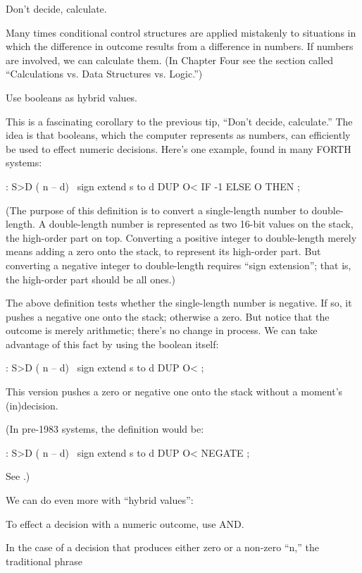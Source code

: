 \begin{tip}
Don't decide, calculate.
\end{tip}
Many times conditional control structures are applied mistakenly to
situations in which the difference in outcome results from a difference in
numbers. If numbers are involved, we can calculate them. (In Chapter
Four see the section called ``Calculations vs. Data Structures vs. Logic.'')

\begin{tip}
Use booleans as hybrid values.
\end{tip}
This is a fascinating corollary to the previous tip, ``Don't decide,
calculate.'' The idea is that booleans, which the computer represents as
numbers, can efficiently be used to effect numeric decisions. Here's one
example, found in many FORTH systems:

\begin{Code}
: S>D  ( n -- d)  \ sign extend s to d
     DUP O<  IF -1  ELSE  O THEN ;
\end{Code}
(The purpose of this definition is to convert a single-length number to
double-length. A double-length number is represented as two 16-bit
values on the stack, the high-order part on top. Converting a positive
integer to double-length merely means adding a zero onto the stack, to
represent its high-order part. But converting a negative integer to
double-length requires ``sign extension''; that is, the high-order part
should be all ones.)

The above definition tests whether the single-length number is
negative. If so, it pushes a negative one onto the stack; otherwise a zero.
But notice that the outcome is merely arithmetic; there's no change
in process. We can take advantage of this fact by using the boolean itself:

\begin{Code}
: S>D  ( n -- d)  \ sign extend s to d
     DUP  O< ;
\end{Code}
This version pushes a zero or negative one onto the stack without a
moment's (in)decision.

(In pre-1983 systems, the definition would be:

\begin{Code}
: S>D  ( n -- d)  \ sign extend s to d
     DUP  O< NEGATE ;
\end{Code}
See .)

We can do even more with ``hybrid values'':

\begin{tip}
To effect a decision with a numeric outcome, use AND.
\end{tip}
In the case of a decision that produces either zero or a non-zero ``n,'' the
traditional phrase

